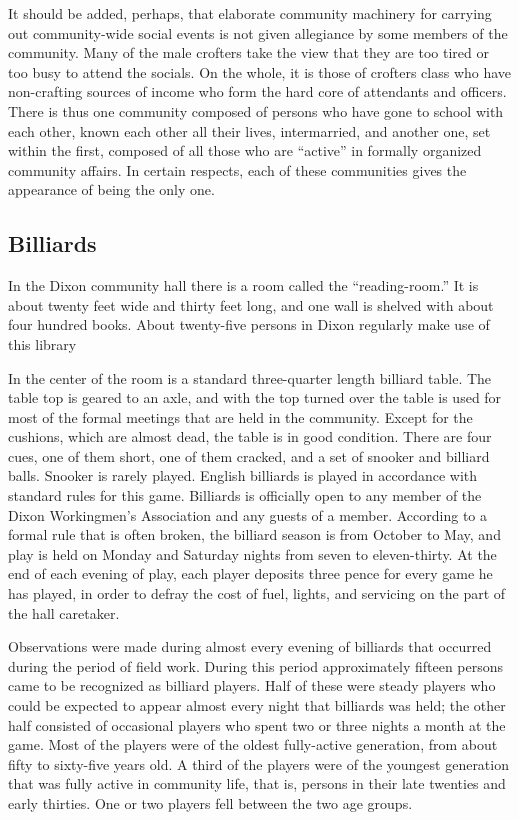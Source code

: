 \documentclass[openany,nobib]{tufte-book}
\begin{document}
It should be added, perhaps, that elaborate community machinery for
carrying out community-wide social events is not given allegiance by
some members of the community. Many of the male crofters take the view
that they are too tired or too busy to attend the socials. On the whole,
it is those of crofters class who have non-crafting sources of income
who form the hard core of attendants and officers. There is thus one
community composed of persons who have gone to school with each other,
known each other all their lives, intermarried, and another one, set
within the first, composed of all those who are ``active'' in formally
organized community affairs. In certain respects, each of these
communities gives the appearance of being the only one.

\hypertarget{billiards}{%
\subsection{Billiards}\label{billiards}}

In the Dixon community hall there is a room called the ``reading-room.''
It is about twenty feet wide and thirty feet long, and one wall is
shelved with about four hundred books. About twenty-five persons in
Dixon regularly make use of this library

In the center of the room is a standard three-quarter length billiard
table. The table top is geared to an axle, and with the top turned over
the table is used for most of the formal meetings that are held in the
community. Except for the cushions, which are almost dead, the table is
in good condition. There are four cues, one of them short, one of them
cracked, and a set of snooker and billiard balls. Snooker is rarely
played. English billiards is played in accordance with standard rules
for this game. Billiards is officially open to any member of the Dixon
Workingmen's Association and any guests of a member. According to a
formal rule that is often broken, the billiard season is from October to
May, and play is held on Monday and Saturday nights from seven to
eleven-thirty. At the end of each evening of play, each player deposits
three pence for every game he has played, in order to defray the cost of
fuel, lights, and servicing on the part of the hall caretaker.

Observations were made during almost every evening of billiards that
occurred during the period of field work. During this period
approximately fifteen persons came to be recognized as billiard players.
Half of these were steady players who could be expected to appear almost
every night that billiards was held; the other half consisted of
occasional players who spent two or three nights a month at the game.
Most of the players were of the oldest fully-active generation, from
about fifty to sixty-five years old. A third of the players were of the
youngest generation that was fully active in community life, that is,
persons in their late twenties and early thirties. One or two players
fell between the two age groups.
\end{document}
